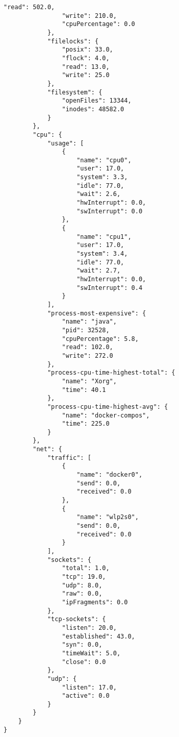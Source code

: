 \begin{lstlisting}[caption={"DstatCollector" JSON result}, captionpos=b, label={lst:json-dstat}]
                "read": 502.0,
                "write": 210.0,
                "cpuPercentage": 0.0
            },
            "filelocks": {
                "posix": 33.0,
                "flock": 4.0,
                "read": 13.0,
                "write": 25.0
            },
            "filesystem": {
                "openFiles": 13344,
                "inodes": 48582.0
            }
        },
        "cpu": {
            "usage": [
                {
                    "name": "cpu0",
                    "user": 17.0,
                    "system": 3.3,
                    "idle": 77.0,
                    "wait": 2.6,
                    "hwInterrupt": 0.0,
                    "swInterrupt": 0.0
                },
                {
                    "name": "cpu1",
                    "user": 17.0,
                    "system": 3.4,
                    "idle": 77.0,
                    "wait": 2.7,
                    "hwInterrupt": 0.0,
                    "swInterrupt": 0.4
                }
            ],
            "process-most-expensive": {
                "name": "java",
                "pid": 32528,
                "cpuPercentage": 5.8,
                "read": 102.0,
                "write": 272.0
            },
            "process-cpu-time-highest-total": {
                "name": "Xorg",
                "time": 40.1
            },
            "process-cpu-time-highest-avg": {
                "name": "docker-compos",
                "time": 225.0
            }
        },
        "net": {
            "traffic": [
                {
                    "name": "docker0",
                    "send": 0.0,
                    "received": 0.0
                },
                {
                    "name": "wlp2s0",
                    "send": 0.0,
                    "received": 0.0
                }
            ],
            "sockets": {
                "total": 1.0,
                "tcp": 19.0,
                "udp": 8.0,
                "raw": 0.0,
                "ipFragments": 0.0
            },
            "tcp-sockets": {
                "listen": 20.0,
                "established": 43.0,
                "syn": 0.0,
                "timeWait": 5.0,
                "close": 0.0
            },
            "udp": {
                "listen": 17.0,
                "active": 0.0
            }
        }
    }
}
\end{lstlisting}

